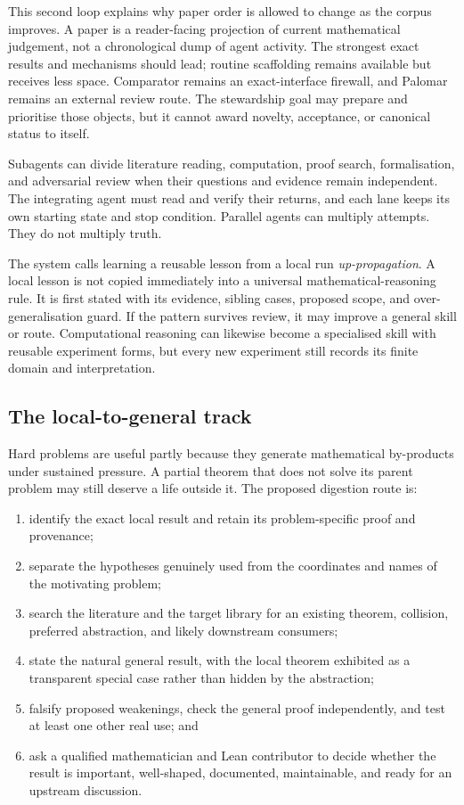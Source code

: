 \documentclass[10pt]{article}
\begin{document}
This second loop explains why paper order is allowed to change as the corpus
improves.  A paper is a reader-facing projection of current mathematical
judgement, not a chronological dump of agent activity.  The strongest exact
results and mechanisms should lead; routine scaffolding remains available but
receives less space.  Comparator remains an exact-interface firewall, and
Palomar remains an external review route.  The stewardship goal may prepare
and prioritise those objects, but it cannot award novelty, acceptance, or
canonical status to itself.

Subagents can divide literature reading, computation, proof search,
formalisation, and adversarial review when their questions and evidence remain
independent.  The integrating agent must read and verify their returns, and
each lane keeps its own starting state and stop condition.  Parallel agents
can multiply attempts.  They do not multiply truth.

The system calls learning a reusable lesson from a local run
\emph{up-propagation}.  A local lesson is not copied immediately into a
universal mathematical-reasoning rule.  It is first stated with its evidence,
sibling cases, proposed scope, and over-generalisation guard.  If the pattern
survives review, it may improve a general skill or route.  Computational
reasoning can likewise become a specialised skill with reusable experiment
forms, but every new experiment still records its finite domain and
interpretation.

\subsection{The local-to-general track}\label{sec:local-to-general}

Hard problems are useful partly because they generate mathematical by-products
under sustained pressure.  A partial theorem that does not solve its parent
problem may still deserve a life outside it.  The proposed digestion route is:

\begin{enumerate}
\item identify the exact local result and retain its problem-specific proof and
      provenance;
\item separate the hypotheses genuinely used from the coordinates and names of
      the motivating problem;
\item search the literature and the target library for an existing theorem,
      collision, preferred abstraction, and likely downstream consumers;
\item state the natural general result, with the local theorem exhibited as a
      transparent special case rather than hidden by the abstraction;
\item falsify proposed weakenings, check the general proof independently, and
      test at least one other real use; and
\item ask a qualified mathematician and Lean contributor to decide whether the
      result is important, well-shaped, documented, maintainable, and ready for
      an upstream discussion.
\end{enumerate}
\end{document}

